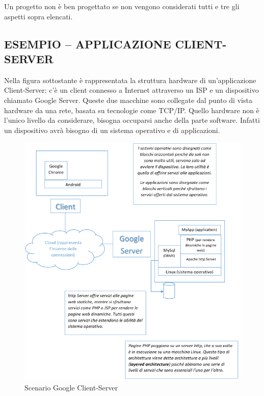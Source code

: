 Un progetto non è ben progettato se non vengono considerati tutti e tre gli aspetti sopra elencati. 

\subsection{ESEMPIO – APPLICAZIONE CLIENT-SERVER}

Nella figura sottostante è rappresentata la struttura hardware di un’applicazione Client-Server: c’è un client connesso a Internet attraverso un ISP e un dispositivo chiamato Google Server. Queste due macchine sono collegate dal punto di vista hardware da una rete, basata su tecnologie come TCP/IP. Quello hardware non è l’unico livello da considerare, bisogna occuparsi anche della parte software. Infatti un dispositivo avrà bisogno di un sistema operativo e di applicazioni. 

\newpage
\begin{center}
\begin{figure}[H]
\centering
\includegraphics[scale=0.8]{figures/google_cs.png}
\caption{Scenario Google Client-Server} 
\end{figure}
\end{center}
\newpage

